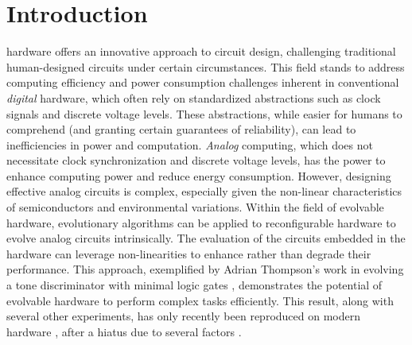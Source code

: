 \documentclass{ieeeaccess}
\begin{document}
\section{Introduction}
\label{sec:introduction}
 hardware offers an innovative approach to circuit design, challenging traditional human-designed circuits under certain circumstances.
This field stands to address computing efficiency and power consumption challenges inherent in conventional \textit{digital} hardware, which often rely on standardized abstractions such as clock signals and discrete voltage levels. 
These abstractions, while easier for humans to comprehend (and granting certain guarantees of reliability), can lead to inefficiencies in power and computation. 
\textit{Analog} computing, which does not necessitate clock synchronization and discrete voltage levels, has the power to enhance computing power and reduce energy consumption.
However, designing effective analog circuits is complex, especially given the non-linear characteristics of semiconductors and environmental variations.
Within the field of evolvable hardware, evolutionary algorithms can be applied to reconfigurable hardware to evolve analog circuits intrinsically. The evaluation of the circuits embedded in the hardware %
can leverage non-linearities to enhance rather than degrade their performance.
This approach, exemplified by Adrian Thompson's work in evolving a tone discriminator with minimal logic gates \cite{Thompson1998OnEvolution}, demonstrates the potential of evolvable hardware to perform complex tasks efficiently.
This result, along with several other experiments, has only recently been reproduced on modern hardware \cite{HoffmannCoBEA:Bitstreams}, after a hiatus due to several factors \cite{Whitley2021ResurrectingHardware}.
\end{document}
